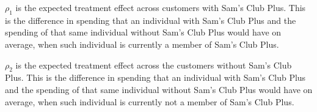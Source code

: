 \documentclass{article}
\begin{document}
\begin{enumerate}[label=\textbf{Q\arabic{enumi}}.,ref=Q\arabic{enumi}, wide=0pt, itemsep=1em, topsep=5pt]
\begin{enumerate}
\begin{solution}
{            \medskip
            
            $\rho_1$ is the expected treatment effect across customers with Sam's Club Plus. This is the difference in spending that an individual with Sam's Club Plus and the spending of that same individual without Sam's Club Plus would have on average, when such individual is currently a member of Sam's Club Plus. 
            
            \medskip
            
            $\rho_2$ is the expected treatment effect across the customers without Sam's Club Plus. This is the difference in spending that an individual with Sam's Club Plus and the spending of that same individual without Sam's Club Plus would have on average, when such individual is currently not a member of Sam's Club Plus.  

            \medskip

}
\end{solution}
\end{enumerate}
\end{enumerate}
\end{document}
